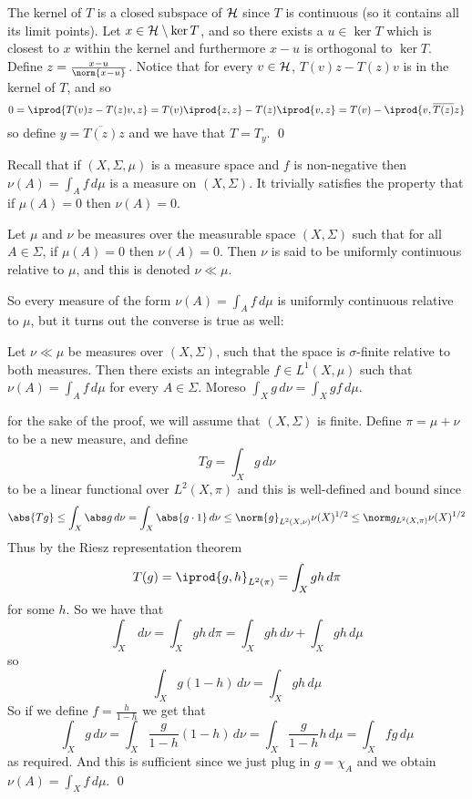 The kernel of $T$ is a closed subspace of ${\cal H}$ since $T$ is continuous (so it contains all its limit points).
Let $x\in{\cal H}\setminus\ker T$, and so there exists a $u\in\ker T$ which is closest to $x$ within the kernel and furthermore $x-u$ is orthogonal to $\ker T$.
Define $z=\frac{x-u}{\norm{x-u}}$.
Notice that for every $v\in{\cal H}$, $T(v)z-T(z)v$ is in the kernel of $T$, and so
$$ 0 = \iprod{T(v)z-T(z)v,z} = T(v)\iprod{z,z} - T(z)\iprod{v,z} = T(v) - \iprod{v,\overline{T(z)}z} $$
so define $y=\overline{T(z)}z$ and we have that $T=T_y$.
\qed

Recall that if $(X,\Sigma,\mu)$ is a measure space and $f$ is non-negative then $\nu(A)=\int_Af\,d\mu$ is a measure on $(X,\Sigma)$.
It trivially satisfies the property that if $\mu(A)=0$ then $\nu(A)=0$.

\bdefn

    Let $\mu$ and $\nu$ be measures over the measurable space $(X,\Sigma)$ such that for all $A\in\Sigma$, if $\mu(A)=0$ then $\nu(A)=0$.
    Then $\nu$ is said to be {\emphcolor uniformly continuous} relative to $\mu$, and this is denoted $\nu\ll\mu$.

\edefn

So every measure of the form $\nu(A)=\int_Af\,d\mu$ is uniformly continuous relative to $\mu$, but it turns out the converse is true as well:

\bthrm[title=Radon-Nikodym, name=radonnikodym]

    Let $\nu\ll\mu$ be measures over $(X,\Sigma)$, such that the space is $\sigma$-finite relative to both measures.
    Then there exists an integrable $f\in L^1(X,\mu)$ such that $\nu(A)=\int_Af\,d\mu$ for every $A\in\Sigma$.
    Moreso $\int_Xg\,d\nu=\int_Xgf\,d\mu$.

\ethrm

\Proof for the sake of the proof, we will assume that $(X,\Sigma)$ is finite.
Define $\pi=\mu+\nu$ to be a new measure, and define
$$ Tg = \int_Xg\,d\nu $$
to be a linear functional over $L^2(X,\pi)$ and this is well-defined and bound since
$$ \abs{Tg} \leq \int_X\abs g\,d\nu = \int_X\abs{g\cdot1}\,d\nu \leq \norm{g}_{L^2(X,\nu)}\nu(X)^{1/2} \leq\norm g_{L^2(X,\pi)}\nu(X)^{1/2} $$
Thus by the Riesz representation theorem
$$ T(g)=\iprod{g,h}_{L^2(\pi)} = \int_Xgh\,d\pi $$
for some $h$.
So we have that
$$ \int_X\,d\nu = \int_Xgh\,d\pi = \int_Xgh\,d\nu + \int_Xgh\,d\mu $$
so
$$ \int_X g(1-h)\,d\nu = \int_Xgh\,d\mu $$
So if we define $f=\frac h{1-h}$ we get that
$$ \int_X g\,d\nu = \int_X \frac g{1-h}(1-h)\,d\nu = \int_X\frac g{1-h}h\,d\mu = \int_X fg\,d\mu $$
as required.
And this is sufficient since we just plug in $g=\chi_A$ and we obtain $\nu(A)=\int_Xf\,d\mu$.
\qed

